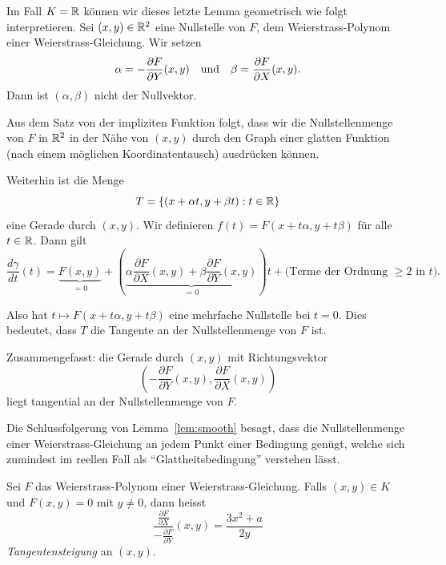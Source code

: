 \begin{bemerkung}
  \label{bem:tangente}
  Im Fall $K={\mathbb{R}}$ können wir dieses letzte Lemma geometrisch wie folgt
  interpretieren.
  Sei $(x,y)\in{\mathbb{R}}^2$ eine Nullstelle von $F$, dem Weierstrass-Polynom
  einer Weierstrass-Gleichung. Wir setzen
  $$\alpha = -\frac{\partial F}{\partial Y}(x,y) \quad\text{und}\quad
  \beta = \frac{\partial F}{\partial X}(x,y).$$
  Dann ist $(\alpha,\beta)$ nicht der Nullvektor.

  Aus dem Satz von der impliziten Funktion folgt, dass wir die
  Nullstellenmenge von $F$ in ${\mathbb{R}}^2$ in der Nähe von $(x,y)$ durch
  den Graph einer glatten Funktion (nach einem möglichen Koordinatentausch)
  ausdrücken können. 

  Weiterhin ist die Menge
  \begin{equation*}
    T = \{(x+\alpha t,y+\beta t) : t\in{\mathbb{R}}\}
  \end{equation*}
  eine Gerade durch $(x,y)$. Wir definieren $f(t) =
  F(x+t\alpha,y+t\beta)$ für alle $t\in{\mathbb{R}}$. 
  Dann gilt 
  \begin{equation*}
    \frac{d\gamma}{dt}(t)
    = \underbrace{F(x,y)}_{=0} + \left(\underbrace{\alpha \frac{\partial F}{\partial X}(x,y)
    +\beta \frac{\partial F}{\partial Y}(x,y)}_{=0}\right)t + \text{(Terme der
      Ordnung $\ge 2$ in $t$)}.
  \end{equation*}
  
  Also hat $t\mapsto F(x+t\alpha,y+t\beta)$ eine mehrfache Nullstelle
  bei $t=0$. Dies bedeutet, dass $T$ die Tangente an der
  Nullstellenmenge von $F$ ist.

  Zusammengefasst: die Gerade durch $(x,y)$ mit Richtungsvektor
  \begin{equation*}
    \left(-\frac{\partial F}{\partial Y}(x,y),\frac{\partial F}{\partial X}(x,y)\right)
  \end{equation*}
  liegt tangential an der Nullstellenmenge von $F$.
\end{bemerkung}

Die Schlussfolgerung von Lemma~\ref{lem:smooth} besagt, dass die
Nullstellenmenge einer Weierstrass-Gleichung an jedem Punkt einer
Bedingung genügt, welche sich zumindest im reellen Fall
als ``Glattheitsbedingung'' verstehen lässt.

\begin{definition}
  \label{def:tangentensteigung}
  Sei $F$ das Weierstrass-Polynom einer Weierstrass-Gleichung. Falls
  $(x,y)\in K$ und $F(x,y)=0$ mit  $y\not=0$, dann heisst
  \begin{equation*}
    \frac{\frac{\partial F}{\partial X}}{-\frac{\partial F}{\partial
        Y}}(x,y) = \frac{3x^2+a}{2y}
  \end{equation*}
  \emph{Tangentensteigung} an $(x,y)$. 
\end{definition}

